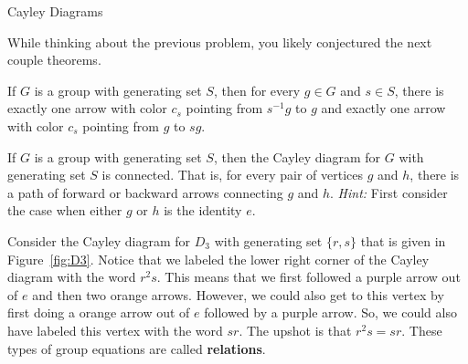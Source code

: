 \begin{section}{Cayley Diagrams}
\begin{figure}[!ht]
\centering
{}
\caption{}
\label{fig:nonRegular}
\end{figure}

While thinking about the previous problem, you likely conjectured the next couple theorems.

\begin{theorem}
If $G$ is a group with generating set $S$, then for every $g\in G$ and $s\in S$, there is exactly one arrow with color $c_s$ pointing from $s^{-1}g$ to $g$ and exactly one arrow with color $c_s$ pointing from $g$ to $sg$. 
\end{theorem}

\begin{theorem}
If $G$ is a group with generating set $S$, then the Cayley diagram for $G$ with generating set $S$ is connected.  That is, for every pair of vertices $g$ and $h$, there is a path of forward or backward arrows connecting $g$ and $h$. \emph{Hint:} First consider the case when either $g$ or $h$ is the identity $e$.
\end{theorem}

Consider the Cayley diagram for $D_3$ with generating set $\{r,s\}$ that is given in Figure~\ref{fig:D3}. Notice that we labeled the lower right corner of the Cayley diagram with the word $r^2s$.  This means that we first followed a {\color{cb-purple}purple} arrow out of $e$ and then two {\color{cb-orange}orange}  arrows.  However, we could also get to this vertex by first doing a {\color{cb-orange}orange}  arrow out of $e$ followed by a {\color{cb-purple}purple} arrow.  So, we could also have labeled this vertex with the word $sr$.  The upshot is that $r^2s=sr$.  These types of group equations are called \textbf{relations}.


\end{section}
